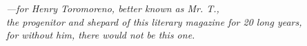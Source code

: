 \vspace*{\fill}
\begin{center}
    \textit{
        ---for Henry Toromoreno, better known as Mr. T.,\\
        the progenitor and shepard of this literary magazine for 20 long years,\\
        for without him, there would not be this one.
    }
\end{center}
\vspace*{\fill}